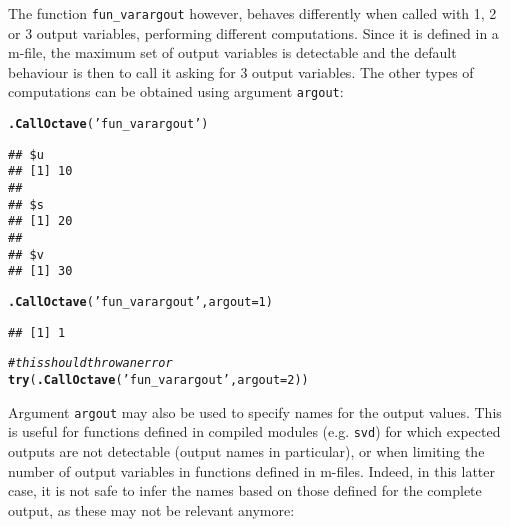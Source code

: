 \documentclass[english,10pt,a4paper]{article}\usepackage[]{graphicx}\usepackage[]{color}
\makeatletter
\newcommand{\hlnum}[1]{\textcolor[rgb]{0.686,0.059,0.569}{#1}}%
\newcommand{\hlstr}[1]{\textcolor[rgb]{0.192,0.494,0.8}{#1}}%
\newcommand{\hlcom}[1]{\textcolor[rgb]{0.678,0.584,0.686}{\textit{#1}}}%
\newcommand{\hlstd}[1]{\textcolor[rgb]{0.345,0.345,0.345}{#1}}%
\newcommand{\hlkwc}[1]{\textcolor[rgb]{0.333,0.667,0.333}{#1}}%
\newcommand{\hlkwd}[1]{\textcolor[rgb]{0.737,0.353,0.396}{\textbf{#1}}}%
\newenvironment{kframe}{%
 \def\at@end@of@kframe{}%
 \ifinner\ifhmode%
  \def\at@end@of@kframe{\end{minipage}}%
  \begin{minipage}{\columnwidth}%
 \fi\fi%
 \def\FrameCommand##1{\hskip\@totalleftmargin \hskip-\fboxsep
 \colorbox{shadecolor}{##1}\hskip-\fboxsep
     \hskip-\linewidth \hskip-\@totalleftmargin \hskip\columnwidth}%
 \MakeFramed {\advance\hsize-\width
   \@totalleftmargin\z@ \linewidth\hsize
   \@setminipage}}%
 {\par\unskip\endMakeFramed%
 \at@end@of@kframe}
\newenvironment{knitrout}{}{} %
\let\code=\texttt
\makeatother
\begin{document}
The function \code{fun\_varargout} however, behaves differently when called
with 1, 2 or 3 output variables, performing different computations.
Since it is defined in a m-file, the maximum set of output variables is
detectable and the default behaviour is then to call it asking for 3 output
variables.
The other types of computations can be obtained using argument \code{argout}:

\begin{knitrout}
\color{fgcolor}\begin{kframe}
\begin{alltt}
\hlkwd{.CallOctave}\hlstd{(}\hlstr{'fun_varargout'}\hlstd{)}
\end{alltt}
\begin{verbatim}
## $u
## [1] 10
## 
## $s
## [1] 20
## 
## $v
## [1] 30
\end{verbatim}
\begin{alltt}
\hlkwd{.CallOctave}\hlstd{(}\hlstr{'fun_varargout'}\hlstd{,} \hlkwc{argout}\hlstd{=}\hlnum{1}\hlstd{)}
\end{alltt}
\begin{verbatim}
## [1] 1
\end{verbatim}
\begin{alltt}
\hlcom{# this should throw an error}
\hlkwd{try}\hlstd{(} \hlkwd{.CallOctave}\hlstd{(}\hlstr{'fun_varargout'}\hlstd{,} \hlkwc{argout}\hlstd{=}\hlnum{2}\hlstd{) )}
\end{alltt}


{\ttfamily\noindent\bfseries{}}\end{kframe}
\end{knitrout}

Argument \code{argout} may also be used to specify names for the output values.
This is useful for functions defined in compiled modules (e.g. \code{svd}) for
which expected outputs are not detectable (output names in particular), or when
limiting the number of output variables in functions defined in m-files.
Indeed, in this latter case, it is not safe to infer the names based on those
defined for the complete output, as these may not be relevant anymore:
\end{document}
